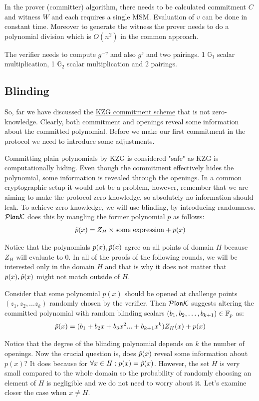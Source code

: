 In the prover (committer) algorithm, there needs to be calculated commitment $C$ and witness $W$ and each requires a single MSM. Evaluation of $v$ can be done in constant time. Moreover to generate the witness the prover needs to do a polynomial division which is $O(n^2)$ in the common approach.

The verifier needs to compute $g^{-v}$ and also $g^z$ and two pairings. 1 $\mathbb{G}_1$ scalar multiplication, 1 $\mathbb{G}_2$ scalar multiplication and 2 pairings.

\subsection{Blinding}
So, far we have discussed the \hyperref[chap:kzg]{KZG commitment scheme} that is not zero-knowledge. Clearly, both commitment and openings reveal some information about the committed polynomial. Before we make our first commitment in the protocol we need to introduce some adjustments.

Committing plain polynomials by KZG is considered "safe" as KZG is computationally hiding. Even though the commitment effectively hides the polynomial, some information is revealed through the openings. In a common cryptographic setup it would not be a problem, however, remember that we are aiming to make the protocol zero-knowledge, so absolutely no information should leak. To achieve zero-knowledge, we will use blinding, by introducing randomness. $\mathcal{P}\mathfrak{lon}\mathcal{K}$ does this by mangling the former polynomial $p$ as follows: $$\Tilde{p}(x) = Z_H \times \text{some expression} + p(x)$$

Notice that the polynomials $p(x), \Tilde{p}(x)$ agree on all points of domain $H$ because $Z_H$ will evaluate to 0. In all of the proofs of the following rounds, we will be interested only in the domain $H$ and that is why it does not matter that $p(x), \Tilde{p}(x)$ might not match outside of $H$.

Consider that some polynomial $p(x)$ should be opened at challenge points $(z_1, z_2, ... z_{k})$ randomly chosen by the verifier. Then $\mathcal{P}\mathfrak{lon}\mathcal{K}$ suggests altering the committed polynomial with random blinding scalars $(b_1, b_2, \ldots, b_{k+1}) \in \mathbb{F}_p$ as: $$\Tilde{p}(x) = (b_1 + b_2x + b_3x^2 ... + b_{k+1}x^{k})Z_H(x) + p(x)$$

Notice that the degree of the blinding polynomial depends on $k$ the number of openings. Now the crucial question is, does $\Tilde{p}(x)$ reveal some information about $p(x)$? It does because for $\forall x \in H: p(x) = \Tilde{p}(x)$. However, the set $H$ is very small compared to the whole domain so the probability of randomly choosing an element of $H$ is negligible and we do not need to worry about it. Let's examine closer the case when $x \neq H$.

